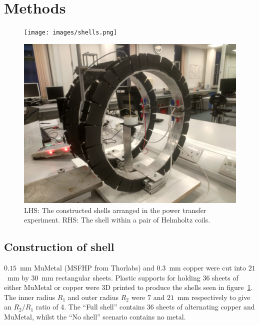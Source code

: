 \documentclass[11pt]{iopart}
\begin{document}
\section{Methods}
\begin{figure}
\begin{center}
    \begin{minipage}{0.315\textwidth}
        \noindent\texttt{[image: images/shells.png]}
    \end{minipage}
    \begin{minipage}{0.553\textwidth}
        \noindent\includegraphics[width=\linewidth]{images/helm.png}
    \end{minipage}
\caption{LHS: The constructed shells arranged in the power transfer
  experiment. RHS: The shell within a pair of Helmholtz coils.}
\label{fig:shells}
\end{center}
\end{figure}

\subsection{Construction of shell}
$0.15$~mm MuMetal (MSFHP from Thorlabs) and $0.3$~mm copper were cut
into $21$~mm by $30$~mm rectangular sheets.  Plastic supports for
holding $36$ sheets of either MuMetal or copper were 3D printed to
produce the shells seen in figure~\ref{fig:shells}. The inner radius
$R_1$ and outer radius $R_2$ were $7$ and $21$~mm respectively to give
an $R_2/R_1$ ratio of 4. The ``Full shell'' contains $36$ sheets of
alternating copper and MuMetal, whilst the ``No shell'' scenario
contains no metal. \\
\end{document}
